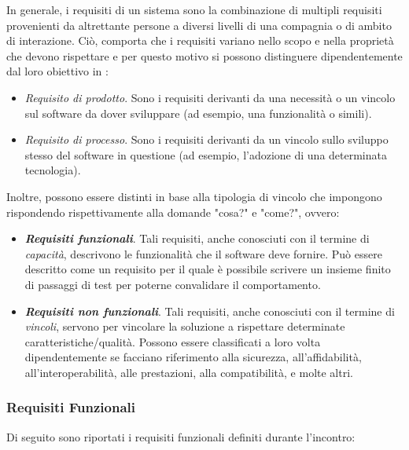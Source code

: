 In generale, i requisiti di un sistema sono la combinazione di multipli requisiti provenienti da altrettante persone a diversi livelli di una compagnia o di ambito di interazione. Ciò, comporta che i requisiti variano nello scopo e nella proprietà che devono rispettare e per questo motivo si possono distinguere dipendentemente dal loro obiettivo in \cite{requirements_types}:

\begin{itemize}
    \item \textit{Requisito di prodotto}. Sono i requisiti derivanti da una necessità o un vincolo sul software da dover sviluppare (ad esempio, una funzionalità o simili).
    \item \textit{Requisito di processo}. Sono i requisiti derivanti da un vincolo sullo sviluppo stesso del software in questione (ad esempio, l'adozione di una determinata tecnologia).
\end{itemize}

Inoltre, possono essere distinti in base alla tipologia di vincolo che impongono rispondendo rispettivamente alla domande "cosa?" e "come?", ovvero:

\begin{itemize}
    \item \textit{\textbf{Requisiti funzionali}}. Tali requisiti, anche conosciuti con il termine di \textit{capacità}, descrivono le funzionalità che il software deve fornire. Può essere descritto come un requisito per il quale è possibile scrivere un insieme finito di passaggi di test per poterne convalidare il comportamento.
    \item \textit{\textbf{Requisiti non funzionali}}. Tali requisiti, anche conosciuti con il termine di \textit{vincoli}, servono per vincolare la soluzione a rispettare determinate caratteristiche/qualità. Possono essere classificati a loro volta dipendentemente se facciano riferimento alla sicurezza, all'affidabilità, all'interoperabilità, alle prestazioni, alla compatibilità, e molte altri.
\end{itemize}

\subsubsection{Requisiti Funzionali}

Di seguito sono riportati i requisiti funzionali definiti durante l'incontro:

